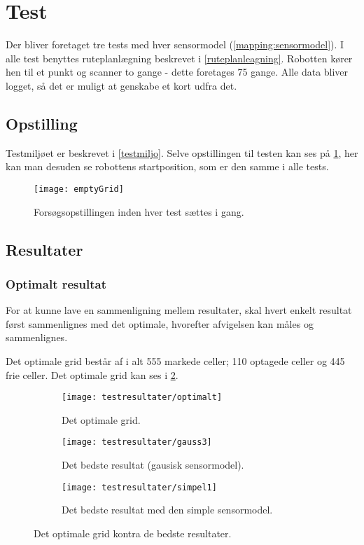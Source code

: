 \section{Test}\label{evaluering:test_beskrivelse}
Der bliver foretaget tre tests med hver sensormodel (\cref{mapping:sensormodel}).
I alle test benyttes ruteplanlægning beskrevet i \cref{ruteplanleagning}.
Robotten kører hen til et punkt og scanner to gange - dette foretages 75 gange.
Alle data bliver logget, så det er muligt at genskabe et kort udfra det.

\subsection{Opstilling}\label{evaluering:opstilling}
Testmiljøet er beskrevet i \cref{testmiljo}.
Selve opstillingen til testen kan ses på \cref{evaluering:emptyGrid}, her kan man desuden se robottens startposition, som er den samme i alle tests.

\begin{figure}[h]
\texttt{[image: emptyGrid]}
\caption{Forsøgsopstillingen inden hver test sættes i gang.}
\label{evaluering:emptyGrid}
\end{figure}

\subsection{Resultater}

\subsubsection*{Optimalt resultat}
For at kunne lave en sammenligning mellem resultater, skal hvert enkelt resultat først sammenlignes med det optimale, hvorefter afvigelsen kan måles og sammenlignes.

Det optimale grid består af i alt 555 markede celler; 110 optagede celler og 445 frie celler.
Det optimale grid kan ses i \cref{evaluering:optimaltgrid}.

\begin{figure}[h]
\begin{subfigure}[t]{.48\textwidth}
\texttt{[image: testresultater/optimalt]}
\caption{Det optimale grid.}
\label{evaluering:optimaltgrid}
\end{subfigure}
\hfill
\begin{subfigure}[t]{.48\textwidth}
\texttt{[image: testresultater/gauss3]}
\caption{Det bedste resultat (gausisk sensormodel).}
\label{evaluering:gauss3}
\end{subfigure}
\centering
\begin{subfigure}[b]{.48\textwidth}
\vspace{0.5em}
\texttt{[image: testresultater/simpel1]}
\caption{Det bedste resultat med den simple sensormodel.}
\label{evaluering:simpel1}
\end{subfigure}
\caption{Det optimale grid kontra de bedste resultater.}
\label{evaluering:optvsbedst}
\end{figure}




